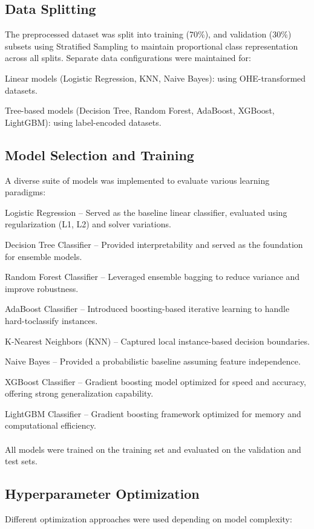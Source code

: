 \subsection{Data Splitting}\label{subsec:data-splitting}
The preprocessed dataset was split into training (70\%), and validation (30\%) subsets using Stratified Sampling to maintain proportional class representation across all splits.
Separate data configurations were maintained for:

Linear models (Logistic Regression, KNN, Naive Bayes): using OHE-transformed datasets.

Tree-based models (Decision Tree, Random Forest, AdaBoost, XGBoost, LightGBM): using label-encoded datasets.

\subsection{Model Selection and Training}\label{subsec:model-selection-and-training}
A diverse suite of models was implemented to evaluate various learning paradigms:

Logistic Regression – Served as the baseline linear classifier, evaluated using regularization (L1, L2) and solver variations.

Decision Tree Classifier – Provided interpretability and served as the foundation for ensemble models.

Random Forest Classifier – Leveraged ensemble bagging to reduce variance and improve robustness.

AdaBoost Classifier – Introduced boosting-based iterative learning to handle hard-toclassify instances.

K-Nearest Neighbors (KNN) – Captured local instance-based decision boundaries.

Naive Bayes – Provided a probabilistic baseline assuming feature independence.

XGBoost Classifier – Gradient boosting model optimized for speed and accuracy, offering strong generalization capability.

LightGBM Classifier – Gradient boosting framework optimized for memory and computational efficiency.
\\ \\
All models were trained on the training set and evaluated on the validation and test sets.

\subsection{Hyperparameter Optimization}\label{subsec:hyperparameter-optimization}
Different optimization approaches were used depending on model complexity:

